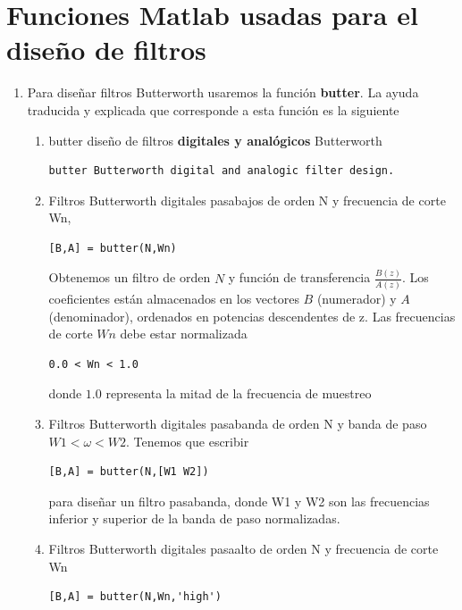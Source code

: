 \section{Funciones Matlab usadas para el dise\~{n}o de filtros}

\begin{enumerate}
        \item   Para dise\~{n}ar  filtros Butterworth  usaremos la   funci\'{o}n \textbf{butter}.
        La ayuda traducida y explicada que corresponde a esta funci\'{o}n es la siguiente
        \begin{enumerate}
                \item   butter dise\~{n}o de filtros \textbf{digitales y anal\'{o}gicos} Butterworth
\begin{verbatim}
butter Butterworth digital and analogic filter design.
\end{verbatim}  
                
                \item   Filtros Butterworth digitales pasabajos de orden N y frecuencia de corte Wn,
\begin{verbatim}
[B,A] = butter(N,Wn) 
\end{verbatim}
                Obtenemos un filtro de orden $N$ y funci\'{o}n de transferencia $\frac{B(z)}{A(z)}$. Los
                coeficientes est\'{a}n almacenados en los vectores $B$ (numerador) y $A$ (denominador), 
                ordenados en potencias descendentes de z. Las frecuencias de corte $Wn$ debe  estar normalizada
\begin{verbatim}
0.0 < Wn < 1.0
\end{verbatim}
                donde $1.0$ representa la mitad de la frecuencia de muestreo

                \item   Filtros Butterworth digitales pasabanda de orden N y banda de paso
                $W1 < \omega < W2$.
                Tenemos que escribir
\begin{verbatim}
[B,A] = butter(N,[W1 W2])                       
\end{verbatim}
              para dise\~{n}ar un filtro pasabanda, donde W1 y W2 son las frecuencias inferior y  superior
              de la banda de paso normalizadas.
        
                \item   Filtros Butterworth digitales pasaalto de orden N y frecuencia de corte Wn
\begin{verbatim}
[B,A] = butter(N,Wn,'high')
\end{verbatim}
                

\end{enumerate}
\end{enumerate}
